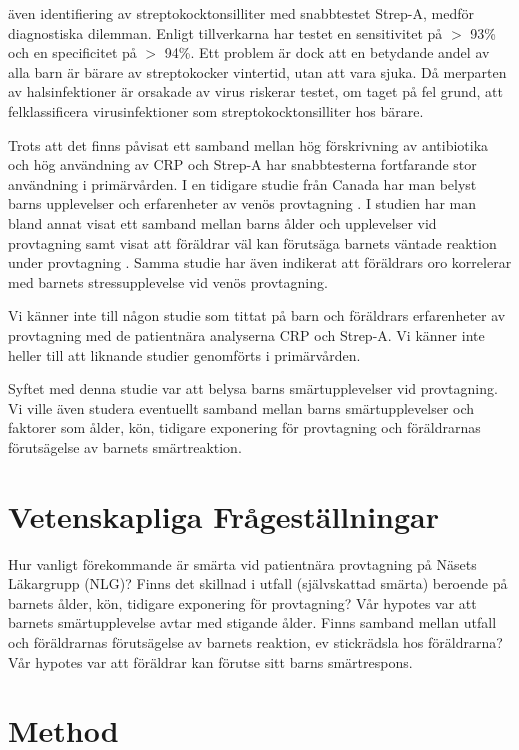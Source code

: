 \documentclass[12pt,twocolumn]{article}
\begin{document}
även identifiering av streptokocktonsilliter med snabbtestet Strep-A, medför
diagnostiska dilemman. Enligt tillverkarna har testet en sensitivitet på $>$
93\% och en specificitet på $>$ 94\%. Ett problem är dock att en betydande
andel av alla barn är bärare av streptokocker vintertid, utan att vara
sjuka. Då merparten av halsinfektioner är orsakade av virus riskerar
testet, om taget på fel grund, att felklassificera virusinfektioner som
streptokocktonsilliter hos bärare.

Trots att det finns påvisat ett samband mellan hög förskrivning av
antibiotika och hög användning av CRP och Strep-A \cite{Studie2014} har
snabbtesterna fortfarande stor användning i primärvården. I en tidigare
studie från Canada har man belyst barns upplevelser och erfarenheter av
venös provtagning \cite{Fradet1990}. I studien har man bland annat visat ett
samband mellan barns ålder och upplevelser vid provtagning samt visat att
föräldrar väl kan förutsäga barnets väntade reaktion under
provtagning \cite{Fradet1990}. Samma studie har även indikerat att
föräldrars oro korrelerar med barnets stressupplevelse vid venös
provtagning.

Vi känner inte till någon studie som tittat på barn och föräldrars
erfarenheter av provtagning med de patientnära analyserna CRP och Strep-A. Vi
känner inte heller till att liknande studier genomförts i
primärvården.

Syftet med denna studie var att belysa barns smärtupplevelser vid provtagning.
Vi ville även studera eventuellt samband mellan barns smärtupplevelser och
faktorer som ålder, kön, tidigare exponering för provtagning och
föräldrarnas förutsägelse av barnets smärtreaktion.

\section{Vetenskapliga Frågeställningar}

Hur vanligt förekommande är smärta vid patientnära provtagning på
Näsets Läkargrupp (NLG)?
Finns det skillnad i utfall (självskattad smärta) beroende på barnets
ålder, kön, tidigare exponering för provtagning? Vår hypotes var att
barnets smärtupplevelse avtar med stigande ålder.
Finns samband mellan utfall och föräldrarnas förutsägelse av barnets
reaktion, ev stickrädsla hos föräldrarna? Vår hypotes var att
föräldrar kan förutse sitt barns smärtrespons.

\section{Method}
\end{document}
